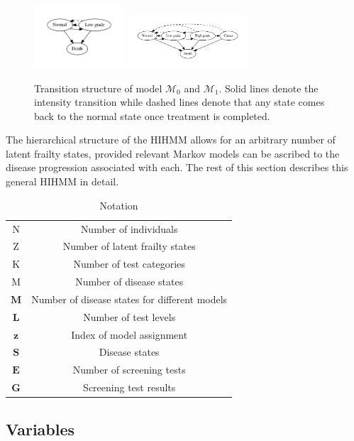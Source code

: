 \documentclass{article}
\begin{document}
\begin{figure}[ht!]
	\centering
	\includegraphics[width = 0.3\textwidth]{pic/M0}
	\includegraphics[width = 0.4\textwidth]{pic/M1}
	\caption{Transition structure of model $\mathcal{M}_0$ and $\mathcal{M}_1$. Solid lines denote the intensity transition while dashed lines denote that any state comes back to the normal state once treatment is completed.}
	\label{Models}
\end{figure}

The hierarchical structure of the HIHMM allows for an arbitrary number of latent frailty states, provided relevant Markov models can be ascribed to the disease progression associated with each.  The rest of this section describes this general HIHMM in detail.  

\begin{table}
	
	\caption{Notation}
	\label{notation}
	\centering
	\begin{tabular}{cc}
		\hline
		N & Number of individuals \\
		Z & Number of latent frailty states \\
		K & Number of test categories \\
		M & Number of disease states\\
		$\bm M$ & Number of disease states for different models  \\
		$\bm L$ & Number of test levels \\
		$\bm z$ & Index of model assignment \\
		$\bm S$ & Disease states \\
		$\bm E$ & Number of screening tests \\
		$\bm G$ & Screening test results \\
		\hline
	\end{tabular}
\end{table}

\subsection{Variables}
\end{document}
